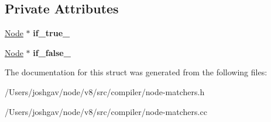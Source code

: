 \subsection*{Private Attributes}
\begin{DoxyCompactItemize}
\item 
\hyperlink{classv8_1_1internal_1_1compiler_1_1_node}{Node} $\ast$ {\bfseries if\+\_\+true\+\_\+}\hypertarget{structv8_1_1internal_1_1compiler_1_1_branch_matcher_a54a3ede774fccabf0a82f7a59171f765}{}\label{structv8_1_1internal_1_1compiler_1_1_branch_matcher_a54a3ede774fccabf0a82f7a59171f765}

\item 
\hyperlink{classv8_1_1internal_1_1compiler_1_1_node}{Node} $\ast$ {\bfseries if\+\_\+false\+\_\+}\hypertarget{structv8_1_1internal_1_1compiler_1_1_branch_matcher_a81661c47d0c730654cb8d4db90fe7876}{}\label{structv8_1_1internal_1_1compiler_1_1_branch_matcher_a81661c47d0c730654cb8d4db90fe7876}

\end{DoxyCompactItemize}


The documentation for this struct was generated from the following files\+:\begin{DoxyCompactItemize}
\item 
/\+Users/joshgav/node/v8/src/compiler/node-\/matchers.\+h\item 
/\+Users/joshgav/node/v8/src/compiler/node-\/matchers.\+cc\end{DoxyCompactItemize}
